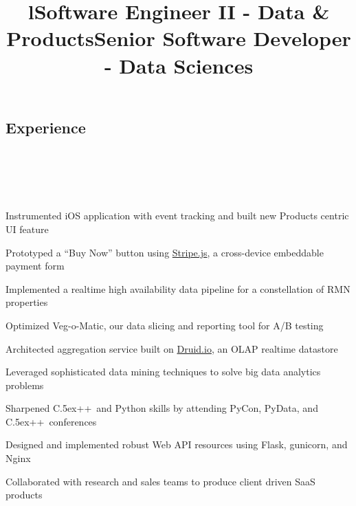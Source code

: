 \documentclass[12pt, tweaklist, line]{res}
\let\tempone\itemize
\let\temptwo\enditemize
\renewenvironment{itemize}{\tempone\vspace{-.15in}\setlength{\topsep}{0pt}\setlength{\itemsep}{3pt}\vspace{-.15in}}{\temptwo}
\def\Cplusplus{{\rm C\raise.5ex\hbox{\small ++}}}
\begin{document}

\begin{resume}

\section{Experience}
\begin{format}
  \\
  \title{l}\\
  \body\\
\end{format}

\title{Software Engineer II - Data \& Products}
\begin{position}
\begin{itemize}
\item Instrumented iOS application with event tracking and built new Products centric UI feature
\item Prototyped a ``Buy Now'' button using \href{https://stripe.com/}{Stripe.js}, a cross-device embeddable payment form
\item Implemented a realtime high availability data pipeline for a constellation of RMN properties
\item Optimized Veg-o-Matic, our data slicing and reporting tool for A/B testing
\item Architected aggregation service built on \href{http://druid.io/}{Druid.io}, an OLAP realtime datastore
\end{itemize}
\end{position}

\title{Senior Software Developer - Data Sciences}
\begin{position}
\begin{itemize}
\item Leveraged sophisticated data mining techniques to solve big data analytics problems
\item Sharpened \Cplusplus~and Python skills by attending PyCon, PyData, and \Cplusplus~conferences
\item Designed and implemented robust Web API resources using Flask, gunicorn, and Nginx
\item Collaborated with research and sales teams to produce client driven SaaS products
\end{itemize}
\end{position}


\end{resume}
\end{document}
